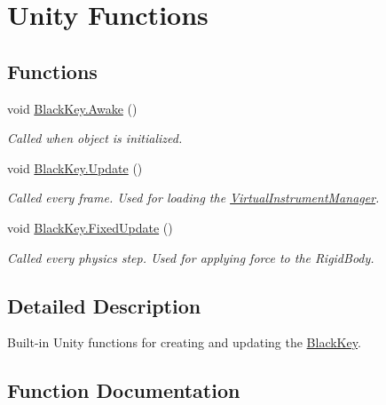 \hypertarget{group___black_key_unity}{}\section{Unity Functions}
\label{group___black_key_unity}
\subsection*{Functions}
\begin{DoxyCompactItemize}
\item 
void \hyperlink{group___black_key_unity_ga6e05fcdf362e52d9a71b4f25ad840b5b}{Black\+Key.\+Awake} ()
\begin{DoxyCompactList}\small\item\em Called when object is initialized. \end{DoxyCompactList}\item 
void \hyperlink{group___black_key_unity_ga24ef6b8b614685c5591868b9b23197ed}{Black\+Key.\+Update} ()
\begin{DoxyCompactList}\small\item\em Called every frame. Used for loading the \hyperlink{class_virtual_instrument_manager}{Virtual\+Instrument\+Manager}. \end{DoxyCompactList}\item 
void \hyperlink{group___black_key_unity_gad8926397bba69558f5440eac2c38aff8}{Black\+Key.\+Fixed\+Update} ()
\begin{DoxyCompactList}\small\item\em Called every physics step. Used for applying force to the Rigid\+Body. \end{DoxyCompactList}\end{DoxyCompactItemize}


\subsection{Detailed Description}
Built-\/in Unity functions for creating and updating the \hyperlink{class_black_key}{Black\+Key}. 

\subsection{Function Documentation}
\mbox{\label{group___black_key_unity_ga6e05fcdf362e52d9a71b4f25ad840b5b}} 
